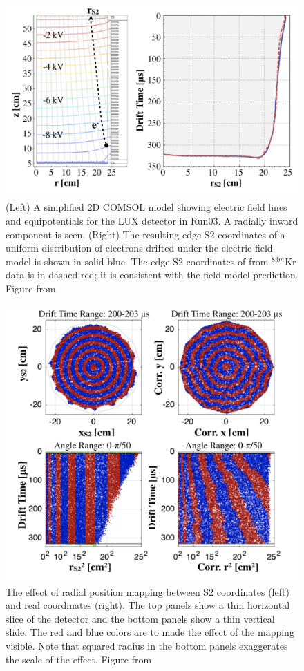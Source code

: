 \begin{figure}[htbp]
\begin{center}
\includegraphics[width=.8\textwidth]{figures/lux/kr_pos1.png}
\caption{ (Left) A simplified 2D COMSOL model showing electric field lines and equipotentials for the \ac{LUX} detector in Run03. A radially inward component is seen. (Right) The resulting edge S2 coordinates of a uniform distribution of electrons drifted under the electric field model is shown in solid blue. The edge S2 coordinates of from $^{83m}$Kr data is in dashed red; it is consistent with the field model prediction. Figure from \cite{LUXKr}}
\label{fig:kr_pos1}
\end{center}
\end{figure}

\begin{figure}[htbp]
\begin{center}
\includegraphics[width=.8\textwidth]{figures/lux/kr_pos2.png}
\caption{ The effect of radial position mapping between S2 coordinates (left) and real coordinates (right). The top panels show a thin horizontal slice of the detector and the bottom panels show a thin vertical slide. The red and blue colors are to made the effect of the mapping visible. Note that squared radius in the bottom panels exaggerates the scale of the effect. Figure from \cite{LUXKr} }
\label{fig:kr_pos2}
\end{center}
\end{figure}

